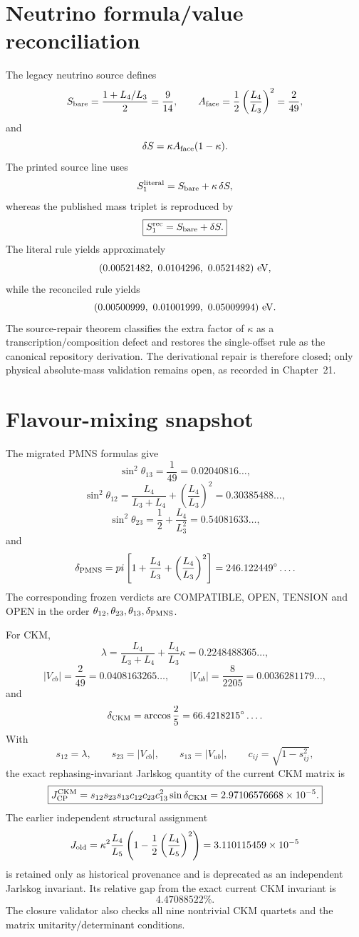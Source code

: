 \section{Neutrino formula/value reconciliation}

The legacy neutrino source defines
\[
S_{\rm bare}=\frac{1+L_4/L_3}{2}=\frac9{14},
\qquad
A_{\rm face}=\frac12\left(\frac{L_4}{L_3}\right)^2=\frac2{49},
\]
and
\[
\delta S=\kappa A_{\rm face}(1-\kappa).
\]
The printed source line uses
\[
S_1^{\rm literal}=S_{\rm bare}+\kappa\,\delta S,
\]
whereas the published mass triplet is reproduced by
\[
\boxed{
S_1^{\rm rec}=S_{\rm bare}+\delta S.
}
\]
The literal rule yields approximately
\[
(0.00521482,\ 0.0104296,\ 0.0521482)\ {\rm eV},
\]
while the reconciled rule yields
\[
(0.00500999,\ 0.01001999,\ 0.05009994)\ {\rm eV}.
\]
The source-repair theorem classifies the extra factor of $\kappa$ as a transcription/composition defect and restores the single-offset rule as the canonical repository derivation. The derivational repair is therefore closed; only physical absolute-mass validation remains open, as recorded in Chapter~21.

\section{Flavour-mixing snapshot}

The migrated PMNS formulas give
\[
\sin^2\theta_{13}=\frac1{49}=0.02040816\ldots,
\]
\[
\sin^2\theta_{12}
=\frac{L_4}{L_3+L_4}
+\left(\frac{L_4}{L_3}\right)^2
=0.30385488\ldots,
\]
\[
\sin^2\theta_{23}
=\frac12+\frac{L_4}{L_3^2}
=0.54081633\ldots,
\]
and
\[
\delta_{\rm PMNS}
=\pi\left[
1+\frac{L_4}{L_3}
+\left(\frac{L_4}{L_3}\right)^2
\right]
=246.122449^\circ\ldots .
\]
The corresponding frozen verdicts are COMPATIBLE, OPEN, TENSION and OPEN in the
order \(\theta_{12},\theta_{23},\theta_{13},\delta_{\rm PMNS}\).

For CKM,
\[
\lambda
=\frac{L_4}{L_3+L_4}
+\frac{L_4}{L_3}\kappa
=0.2248488365\ldots,
\]
\[
|V_{cb}|=\frac2{49}=0.0408163265\ldots,
\qquad
|V_{ub}|=\frac8{2205}=0.0036281179\ldots,
\]
and
\[
\delta_{\rm CKM}=\arccos\frac25=66.4218215^\circ\ldots .
\]
With
\[
s_{12}=\lambda,\qquad s_{23}=|V_{cb}|,\qquad s_{13}=|V_{ub}|,
\qquad c_{ij}=\sqrt{1-s_{ij}^2},
\]
the exact rephasing-invariant Jarlskog quantity of the current CKM matrix is
\[
\boxed{
J_{\rm CP}^{\rm CKM}
=s_{12}s_{23}s_{13}c_{12}c_{23}c_{13}^2\sin\delta_{\rm CKM}
=2.97106576668\times10^{-5}.
}
\]
The earlier independent structural assignment
\[
J_{\rm old}
=\kappa^2\frac{L_4}{L_5}
\left(1-\frac12\left(\frac{L_4}{L_5}\right)^2\right)
=3.110115459\times10^{-5}
\]
is retained only as historical provenance and is deprecated as an independent
Jarlskog invariant.  Its relative gap from the exact current CKM invariant is
\[
4.47088522\%.
\]
The closure validator also checks all nine nontrivial CKM quartets and the
matrix unitarity/determinant conditions.

